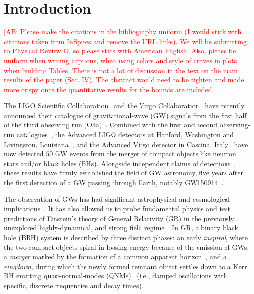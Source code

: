 \documentclass[twocolumn,prd,aps,superscriptaddress,preprintnumbers,tightenlines,showpacs,nofootinbib,eqsecnum,amsfonts,amsmath]{revtex4-1}
\newcommand{\comment}[1]{\textcolor{red}{[#1]}}
\begin{document}
\maketitle


\section{Introduction}\label{sec:intro}

\comment{AB: Please make the citations in the bibliography uniform (I would stick with citations 
taken from InSpires and remove the URL links). We will be submitting to Physical Review D, so please 
stick with American English. Also, please be uniform when writing captions, when using colors and style 
of curves in plots, when building Tables. There is not a lot of discussion in the text on the main results of the paper (Sec. IV). 
The abstract would need to be tighten and made more crispy once the quantitative results for the 
bounds are included.}

The LIGO Scientific Collaboration~\citep{lsc} and the Virgo
Collaboration~\citep{Virgo} have recently announced their catalogue of
gravitational-wave (GW) signals from the first
half of the third observing run (O3a)~\cite{Abbott:2020niy}. Combined
with the first and second observing-run catalogues~\cite{LIGOScientific:2018mvr}, the Advanced LIGO detectors at Hanford,
Washington and Livingston, Louisiana~\citep{aasi2015characterization},
and the Advanced Virgo detector in Cascina,
Italy~\citep{acernese2014advanced} have now detected $50$ GW
events from the merger of compact objects like neutron stars and/or
black holes (BHs). Alongside independent claims of
detections~\citep{nitz20191,nitz20202,2019PhRvD.100b3007Z,2020PhRvD.101h3030V,Venumadhav_2020}, these results have firmly established the field of GW astronomy, five years after the first detection of a GW passing through Earth, notably GW150914~\citep{abbott2016observation}.

The observation of GWs has had significant astrophysical and cosmological
implications~\citep{LSC_2016astroph,gw170817_mma,gw170817_joint,gw170817_hubble}. It
has also allowed us to probe fundamental
physics and test predictions of Einstein's theory of General Relativity 
(GR) in the previously unexplored highly-dynamical, and strong field 
regime~\citep{LSC_2016grtests,GW170817_TGR,gwtc1_tgr}. In GR, a binary black hole (BBH) system is described by
three distinct phases: an early \textit{inspiral}, where the two
compact objects spiral in loosing energy because of the emission of GWs, a \textit{merger} marked by the
formation of a common apparent horizon~\citep{NRpaper}, and a \textit{ringdown}, during which the newly formed remnant object settles down to a Kerr BH emitting quasi-normal-modes (QNMs)~\citep{vishu,earlyqnmpapers} (i.e., damped oscillations with specific, discrete frequencies and decay times).
\end{document}
